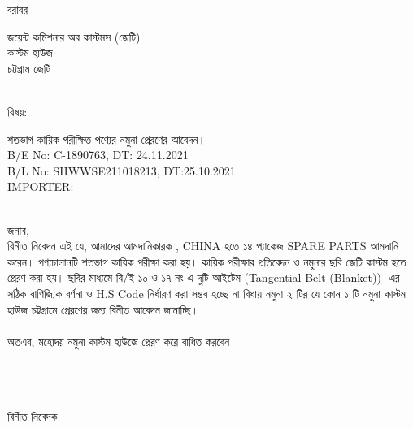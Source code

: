 \documentclass[12pt]{article}
\newcommand{\beno}{C-1890763}
\newcommand{\bedt}{24.11.2021}
\newcommand{\blno}{SHWWSE211018213}
\newcommand{\bldt}{25.10.2021}
\newcommand{\good}{SPARE PARTS}
\newcommand{\co}{CHINA}
\newcommand{\impn}{\htf}
\begin{document}
\noindent
বরাবর
\\
\begin{minipage}[t]{0.06\linewidth}
\hspace{1em}
\end{minipage}
\begin{minipage}[t]{0.94\linewidth}
জয়েন্ট কমিশনার অব কাস্টমস (জেটি)
\\
কাস্টম হাউজ
\\
চট্টগ্রাম জেটি।
\\
\\
\end{minipage}
\begin{minipage}[t]{0.06\linewidth}
বিষয়:
\end{minipage}
\begin{minipage}[t]{0.94\linewidth}
শতভাগ কায়িক পরীক্ষিত পণ্যের নমুনা প্রেরণের আবেদন।
\\
B/E No: {\beno}, DT: {\bedt}
\\
B/L No: {\blno}, DT:{\bldt}
\\
IMPORTER: {\impn}
\\
\\
\end{minipage}
জনাব,
\\
\hspace*{2.7em}বিনীত নিবেদন এই যে, আমাদের আমদানিকারক {\impn},
{\co} হতে ১৪ প্যাকেজ {\good}
আমদানি করেন।
পণ্যচালানটি শতভাগ কায়িক পরীক্ষা
করা হয়। কায়িক পরীক্ষার প্রতিবেদন ও নমুনার ছবি
জেটি কাস্টম হতে প্রেরণ করা হয়।
ছবির মাধ্যমে বি/ই ১০ ও ১৭ নং এ দুটি আইটেম
(Tangential Belt (Blanket))
-এর
সঠিক
বাণিজ্যিক বর্ণনা ও H.S Code নির্ধারণ করা সম্ভব হচ্ছে না
বিধায় নমুনা
২ টির যে কোন ১ টি নমুনা
কাস্টম হাউজ চট্টগ্রামে প্রেরণের জন্য বিনীত আবেদন জানাচ্ছি।
\\
\\
অতএব, মহোদয়
নমুনা কাস্টম হাউজে প্রেরণ করে বাধিত
করবেন
\\
\\
\\
\\
\begin{minipage}[t]{0.50\linewidth}
\hspace{1em}
\end{minipage}
\begin{minipage}[t]{0.60\linewidth}
বিনীত নিবেদক
\\
\\
\\
\\
\\
{\cnfn}
\end{minipage}
\thispagestyle{laststyle}
\end{document}
